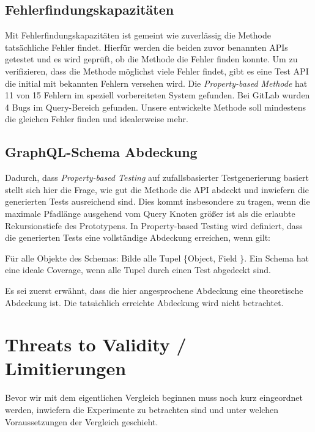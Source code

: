 \subsection{Fehlerfindungskapazitäten}

Mit Fehlerfindungskapazitäten ist gemeint wie zuverlässig die Methode tatsächliche Fehler findet.
Hierfür werden die beiden zuvor benannten APIs getestet und es wird geprüft, ob die Methode die Fehler finden konnte.
Um zu verifizieren, dass die Methode möglichst viele Fehler findet, gibt es eine Test API die
initial mit bekannten Fehlern versehen wird.
Die \textit{Property-based Methode} hat 11 von 15 Fehlern im speziell vorbereiteten System gefunden.
Bei GitLab wurden 4 Bugs im Query-Bereich gefunden.
Unsere entwickelte Methode soll mindestens die gleichen Fehler finden und idealerweise mehr.

\subsection{GraphQL-Schema Abdeckung}

Dadurch, dass \textit{Property-based Testing} auf zufallsbasierter Testgenerierung basiert stellt sich hier die Frage, wie gut die Methode
die API abdeckt und inwiefern die generierten Tests ausreichend sind.
Dies kommt insbesondere zu tragen, wenn die maximale Pfadlänge ausgehend vom Query Knoten größer ist als die erlaubte Rekursionstiefe des Prototypens.
In Property-based Testing wird definiert, dass die generierten Tests eine vollständige Abdeckung erreichen, wenn gilt:

\begin{definition}
    Für alle Objekte des Schemas: Bilde alle Tupel \{Object, Field \}.
    Ein Schema hat eine ideale Coverage, wenn alle Tupel durch einen Test abgedeckt sind. \cite[vgl. B. Measuring Schema Coverage ]{property-based-testing}
    \label{defedgecov}
\end{definition}

Es sei zuerst erwähnt, dass die hier angesprochene Abdeckung eine theoretische Abdeckung ist.
Die tatsächlich erreichte Abdeckung wird nicht betrachtet.

\section{Threats to Validity / Limitierungen}

Bevor wir mit dem eigentlichen Vergleich beginnen muss noch kurz eingeordnet werden, inwiefern die Experimente zu betrachten
sind und unter welchen Voraussetzungen der Vergleich geschieht.

